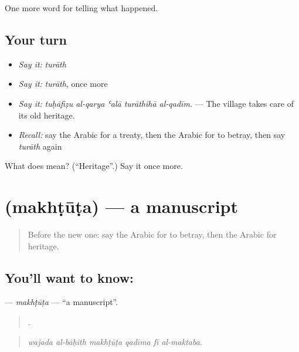 \begin{grammarlens}[title={What you've built}]
One more word for telling what happened.
\end{grammarlens}

\subsection*{Your turn}
\begin{itemize}
\raggedright
  \item \emph{Say it:} \emph{turāth}
  \item \emph{Say it:} \emph{turāth}, once more
  \item \emph{Say it:} \emph{tuḥāfiẓu al-qarya ʿalā turāthihā al-qadīm.} — The village takes care of its old heritage.
  \item \emph{Recall:} say the Arabic for a treaty, then the Arabic for to betray, then say \emph{turāth} again
\end{itemize}

\begin{tcolorbox}[breakable,colback=teal!4,colframe=teal!35!black,title={Before you move on}]
What does  mean? (\textquotedblleft{}Heritage\textquotedblright{}.) Say it once more.
\end{tcolorbox}
\section[\texorpdfstring{\ar{مخطوطة} (makhṭūṭa)}{مخطوطة (makhṭūṭa)}]{ (makhṭūṭa) — a manuscript}

\label{lesson:AR-C342-makhtuta}



\begin{quote}
Before the new one: say the Arabic for to betray, then the Arabic for heritage.
\end{quote}

\subsection*{You'll want to know: }
\textbf{} — \emph{makhṭūṭa} — \textquotedblleft{}a manuscript\textquotedblright{}.

\begin{quote}
     .
\end{quote}

\begin{quote}
\emph{wajada al-bāḥith makhṭūṭa qadīma fī al-maktaba.}
\end{quote}

